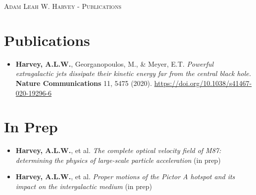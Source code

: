 \documentclass[localFont,alternative]{yaac-another-awesome-cv}
\begin{document}
	\makecvheader
	\makecvfooter
		{\textsc{}} %
		{\textsc{Adam Leah W. Harvey - Publications}}
		{\thepage}

        \section{\texorpdfstring{\color{Blue}Publications}{Publications}}

        \begin{itemize}
            \item \textbf{Harvey, A.L.W.}, Georganopoulos, M., \& Meyer, E.T. \emph{Powerful extragalactic jets dissipate their kinetic energy far from the central black hole.} \textbf{Nature Communications} 11, 5475 (2020). \url{https://doi.org/10.1038/s41467-020-19296-6}
        \end{itemize}

        \section{\texorpdfstring{\color{Blue}In Prep}{In Prep}}

        \begin{itemize}
            \item \textbf{Harvey, A.L.W.}, et al. \emph{The complete optical velocity field of M87: determining the physics of large-scale particle acceleration} (in prep)
        \end{itemize}

        \begin{itemize}
            \item \textbf{Harvey, A.L.W.}, et al. \emph{Proper motions of the Pictor A hotspot and its impact on the intergalactic medium} (in prep)
        \end{itemize}
\end{document}
